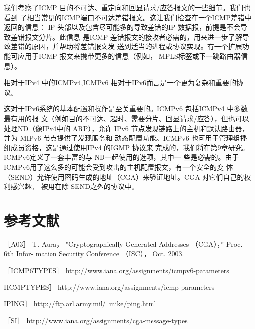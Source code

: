我们考察了ICMP 目的不可达、重定向和回显请求/应答报文的一些细节。我们也看到
了相当常见的ICMP端口不可达差错报文。这让我们检查在一个ICMP差错中返回的信息：
IP 头部以及包含尽可能多的导致差错的IP 数据报，前提是不会导致差错报文分片。此信息
是ICMP 差错报文的接收者必需的，用来进一步了解导致差错的原因，并帮助将差错报文发
送到适当的进程或协议实现。有一个扩展功能可应用于ICMP 报文来携带更多的信息（例如，
MPLS标签或下一跳路由器信息）。

相对于IPv4 中的ICMPv4,ICMPv6 相对于IPv6而言是一个更为复杂和重要的协议。

这对于IPv6系统的基本配置和操作是至关重要的。ICMPv6 包括ICMPv4 中多数最有用的报
文（例如目的不可达、超时、需要分片、回显请求/应答），但也可以处理ND（像IPv4中的
ARP），允许 IPv6 节点发现链路上的主机和默认路由器，并为 MIPv6 节点提供了发现服务和
动态配置功能。ICMPv6 也可用于管理组播组成员资格，这是通过使用IPv4 的IGMP 协议来
完成的，我们将在第9章研究。ICMPv6定义了一套丰富的与 ND一起使用的选项，其中一
些是必需的。由于ICMPv6用了这么多的可能会受到攻击的主机配置报文，有一个安全的变
体（SEND）允许使用密码生成的地址（CGA）来验证地址。CGA 对它们自己的权利感兴趣，
被用在除 SEND之外的协议中。

\section{参考文献}
［A03］ T. Aura， "Cryptographically Generated Addresses （CGA），” Proc. 6th Infor-
mation Security Conference （ISC）， Oct. 2003.

［ICMP6TYPES］ http://www.iana.org/assignments/icmpv6-parameters

IICMPTYPES］ http://www.iana.org/assignments/icmp-parameters

IPING］ http://ftp.arl.army.mil/~mike/ping.html

［SI］ http://www.iana.org/assignments/cga-message-types
